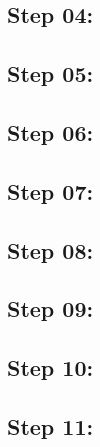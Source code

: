 \subsection{Step 04: }
\subsection{Step 05: }
\subsection{Step 06: }
\subsection{Step 07: }
\subsection{Step 08: }
\subsection{Step 09: }
\subsection{Step 10: }
\subsection{Step 11: }
